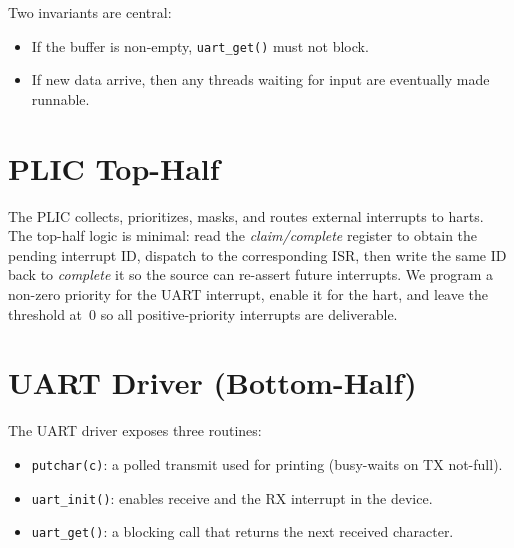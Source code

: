 Two invariants are central:
\begin{itemize}
  \item If the buffer is non-empty, \texttt{uart\_get()} must not block.
  \item If new data arrive, then any threads waiting for input are eventually made runnable.
\end{itemize}

\section{PLIC Top-Half}
\label{sec:plic}

The PLIC collects, prioritizes, masks, and routes external interrupts to harts. The top-half logic
is minimal: read the \emph{claim/complete} register to obtain the pending interrupt ID, dispatch to
the corresponding ISR, then write the same ID back to \emph{complete} it so the source can re-assert
future interrupts. We program a non-zero priority for the UART interrupt, enable it for the hart,
and leave the threshold at~0 so all positive-priority interrupts are deliverable.

\begin{figure}[H]
\centering

\end{figure}

\begin{figure}[H]
\centering

\end{figure}

\section{UART Driver (Bottom-Half)}
\label{sec:uart}

The UART driver exposes three routines:
\begin{itemize}
  \item \texttt{putchar(c)}: a polled transmit used for printing (busy-waits on TX not-full).
  \item \texttt{uart\_init()}: enables receive and the RX interrupt in the device.
  \item \texttt{uart\_get()}: a blocking call that returns the next received character.
\end{itemize}

